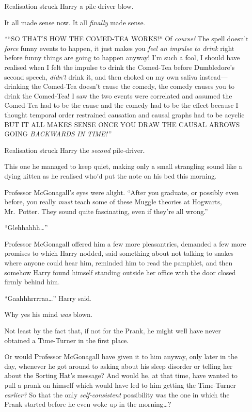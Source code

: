 Realisation struck Harry a pile-driver blow.

It all made sense now. It all \emph{finally} made sense.

*``SO THAT'S HOW THE COMED-TEA WORKS!* Of \emph{course!} The spell
doesn't \emph{force} funny events to happen, it just makes you
\emph{feel an impulse to drink} right before funny things are going to
happen anyway! I'm such a fool, I should have realised when I felt the
impulse to drink the Comed-Tea before Dumbledore's second speech,
\emph{didn't} drink it, and then choked on my own saliva
instead---drinking the Comed-Tea doesn't cause the comedy, the comedy
causes you to drink the Comed-Tea! I saw the two events were correlated
and assumed the Comed-Tea had to be the cause and the comedy had to be
the effect because I thought temporal order restrained causation and
causal graphs had to be acyclic BUT IT ALL MAKES SENSE ONCE YOU DRAW THE
CAUSAL ARROWS GOING \emph{BACKWARDS IN TIME!''}

Realisation struck Harry the \emph{second} pile-driver.

This one he managed to keep quiet, making only a small strangling sound
like a dying kitten as he realised who'd put the note on his bed this
morning.

Professor McGonagall's eyes were alight. ``After you graduate, or
possibly even before, you really \emph{must} teach some of these Muggle
theories at Hogwarts, Mr.~Potter. They sound quite fascinating, even if
they're all wrong.''

``Glehhahhh\ldots{}''

Professor McGonagall offered him a few more pleasantries, demanded a few
more promises to which Harry nodded, said something about not talking to
snakes where anyone could hear him, reminded him to read the pamphlet,
and then somehow Harry found himself standing outside her office with
the door closed firmly behind him.

``Gaahhhrrrraa\ldots{}'' Harry said.

Why yes his mind \emph{was} blown.

Not least by the fact that, if not for the Prank, he might well have
never obtained a Time-Turner in the first place.

Or would Professor McGonagall have given it to him anyway, only later in
the day, whenever he got around to asking about his sleep disorder or
telling her about the Sorting Hat's message? And would he, at that time,
have wanted to pull a prank on himself which would have led to him
getting the Time-Turner \emph{earlier?} So that the only
\emph{self-consistent} possibility was the one in which the Prank
started before he even woke up in the morning\ldots{}?

